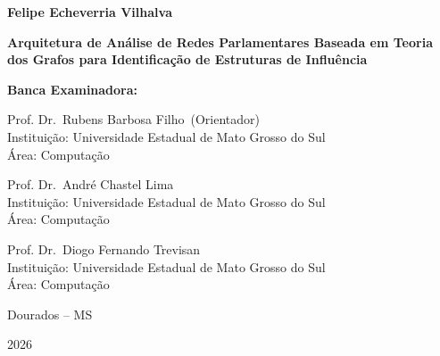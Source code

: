 \documentclass[
      12pt,
      a4paper,
      openright,
      oneside,
      chapter=TITLE,
      section=TITLE,
      english,
      french,
      spanish,
      brazilian
    ]{abntex2}
\newcommand{\nomeDoAutor}{Felipe Echeverria Vilhalva}
\newcommand{\tituloDoTrabalho}{Arquitetura de Análise de Redes Parlamentares Baseada em Teoria dos Grafos para Identificação de Estruturas de Influência}
\newcommand{\anoDeEntrega}{2026}
\newcommand{\nomeDoOrientador}{Rubens Barbosa Filho}
\newcommand{\tituloDoOrientador}{Prof. Dr.}
\newcommand{\instituicaoorientador}{Universidade Estadual de Mato Grosso do Sul}
\newcommand{\nomeDoMembroA}{André Chastel Lima}
\newcommand{\tituloDoMembroA}{Prof. Dr.}
\newcommand{\instituicaomembroA}{Universidade Estadual de Mato Grosso do Sul}
\newcommand{\nomeDoMembroB}{Diogo Fernando Trevisan}
\newcommand{\tituloDoMembroB}{Prof. Dr.}
\newcommand{\instituicaomembroB}{Universidade Estadual de Mato Grosso do Sul}
\newcommand{\nomeDaCidade}{Dourados}
\begin{document}
        \begin{folhadeaprovacao}

            \begin{center}
                {\bfseries\nomeDoAutor}

                \vspace*{\fill}\vspace*{\fill}

                {\bfseries\tituloDoTrabalho}
            \end{center}

            \vspace*{\fill}

            \noindent\textbf{Banca Examinadora:}\par
            \vspace*{0.8cm}

            \noindent\tituloDoOrientador\ \nomeDoOrientador\ (Orientador)\\
            Instituição: \instituicaoorientador\\
            Área: Computação\par
            \vspace*{0.8cm}

            \noindent\tituloDoMembroA\ \nomeDoMembroA\\
            Instituição: \instituicaomembroA\\
            Área: Computação\par
            \vspace*{0.8cm}

            \noindent\tituloDoMembroB\ \nomeDoMembroB\\
            Instituição: \instituicaomembroB\\
            Área: Computação\par

            \vspace*{\fill}

            \begin{center}
                \MakeUppercase\nomeDaCidade{} -- MS\par
                \anoDeEntrega
            \end{center}

        \end{folhadeaprovacao}
    
\end{document}
